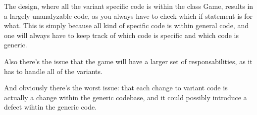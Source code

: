 The design, where all the variant specific code is within the class Game, results in a
largely unanalyzable code, as you always have to check which if statement is
for what. 
This is simply because all kind of specific code is within general code, and
one will always have to keep track of which code is specific and which code is
generic.

Also there's the issue that the game will have a larger set of
responsabilities, as it has to handle all of the variants.

And obviously there's the worst issue: that each change to variant code is
actually a change within the generic codebase, and it could possibly introduce
a defect wihtin the generic code. 

